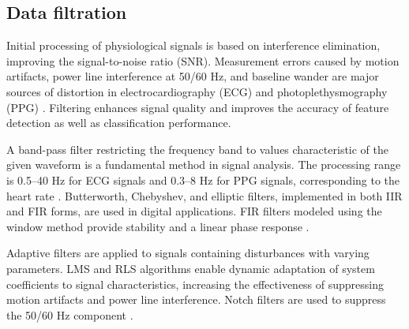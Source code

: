 \documentclass{citask}
\begin{document}
\subsection{Data filtration}
Initial processing of physiological signals is based on interference elimination, improving the signal-to-noise ratio (SNR). Measurement errors caused by motion artifacts, power line interference at 50/60 Hz, and baseline wander are major sources of distortion in electrocardiography (ECG) and photoplethysmography (PPG) \cite{2}. Filtering enhances signal quality and improves the accuracy of feature detection as well as classification performance.

A band-pass filter restricting the frequency band to values characteristic of the given waveform is a fundamental method in signal analysis. The processing range is 0.5–40 Hz for ECG signals and 0.3–8 Hz for PPG signals, corresponding to the heart rate \cite{3}. Butterworth, Chebyshev, and elliptic filters, implemented in both IIR and FIR forms, are used in digital applications. FIR filters modeled using the window method provide stability and a linear phase response \cite{4}.

Adaptive filters are applied to signals containing disturbances with varying parameters. LMS and RLS algorithms enable dynamic adaptation of system coefficients to signal characteristics, increasing the effectiveness of suppressing motion artifacts and power line interference. Notch filters are used to suppress the 50/60 Hz component \cite{5}.
\end{document}
